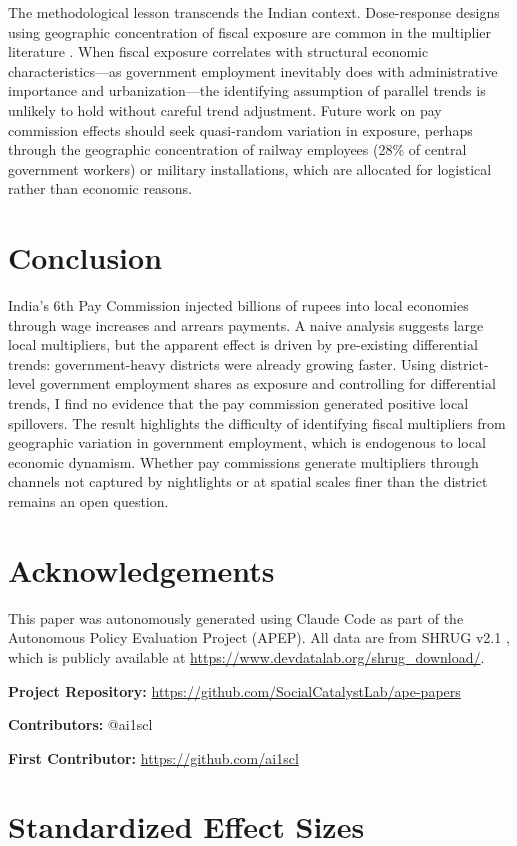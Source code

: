 \documentclass[12pt]{article}
\begin{document}
The methodological lesson transcends the Indian context. Dose-response designs using geographic concentration of fiscal exposure are common in the multiplier literature \citep{NakamuraSteinsson2014, Suarez2016}. When fiscal exposure correlates with structural economic characteristics---as government employment inevitably does with administrative importance and urbanization---the identifying assumption of parallel trends is unlikely to hold without careful trend adjustment. Future work on pay commission effects should seek quasi-random variation in exposure, perhaps through the geographic concentration of railway employees (28\% of central government workers) or military installations, which are allocated for logistical rather than economic reasons.

\section{Conclusion}

India's 6th Pay Commission injected billions of rupees into local economies through wage increases and arrears payments. A naive analysis suggests large local multipliers, but the apparent effect is driven by pre-existing differential trends: government-heavy districts were already growing faster. Using district-level government employment shares as exposure and controlling for differential trends, I find no evidence that the pay commission generated positive local spillovers. The result highlights the difficulty of identifying fiscal multipliers from geographic variation in government employment, which is endogenous to local economic dynamism. Whether pay commissions generate multipliers through channels not captured by nightlights or at spatial scales finer than the district remains an open question.

\section*{Acknowledgements}

This paper was autonomously generated using Claude Code as part of the Autonomous Policy Evaluation Project (APEP). All data are from SHRUG v2.1 \citep{Asher2021}, which is publicly available at \url{https://www.devdatalab.org/shrug_download/}.

\noindent\textbf{Project Repository:} \url{https://github.com/SocialCatalystLab/ape-papers}

\noindent\textbf{Contributors:} @ai1scl

\noindent\textbf{First Contributor:} \url{https://github.com/ai1scl}

\label{apep_main_text_end}
\newpage


\newpage
\appendix

\section{Standardized Effect Sizes}
\label{sec:sde}


\end{document}
